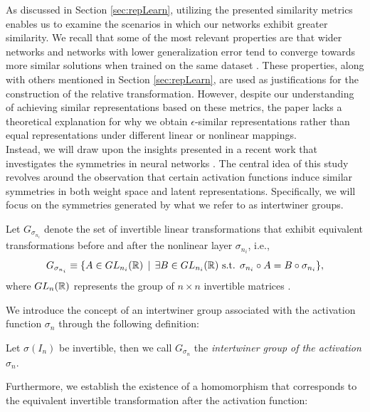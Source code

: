 \documentclass[../main.tex]{subfiles}
\begin{document}
As discussed in Section \ref{sec:repLearn}, utilizing the presented similarity metrics enables us to examine the scenarios in which our networks exhibit greater similarity. We recall that some of the most relevant properties are that wider networks and networks with lower generalization error tend to converge towards more similar solutions when trained on the same dataset \cite{morcos_insights_2018}. These properties, along with others mentioned in Section \ref{sec:repLearn}, are used as justifications for the construction of the relative transformation. However, despite our understanding of achieving similar representations based on these metrics, the paper lacks a theoretical explanation for why we obtain $\epsilon$-similar representations rather than equal representations under different linear or nonlinear mappings.\\

Instead, we will draw upon the insights presented in a recent work that investigates the symmetries in neural networks \cite{godfrey_symmetries_2023}. The central idea of this study revolves around the observation that certain activation functions induce similar symmetries in both weight space and latent representations. Specifically, we will focus on the symmetries generated by what we refer to as intertwiner groups.

Let $G_{\sigma_{n_i}}$ denote the set of invertible linear transformations that exhibit equivalent transformations before and after the nonlinear layer $\sigma_{n_i}$, i.e.,
\begin{equation*}
    G_{\sigma_{n_i}} \equiv \{A \in GL_{n_i}(\mathbb{R}) \, \mid \, \exists B\in
  GL_{n_i}(\mathbb{R})  \text{ s.t. } \sigma_{n_i} \circ A = B \circ \sigma_{n_i} \},
\end{equation*}
where $GL_{n}(\mathbb{R})$ represents the group of $n \times n$ invertible matrices \cite{godfrey_symmetries_2023}.

We introduce the concept of an intertwiner group associated with the activation function $\sigma_n$ through the following definition:

\begin{definition}
  \label{def:intertwiner}
  Let $\sigma(I_n)$ be invertible, then we call $G_{\sigma_n}$ the \emph{intertwiner group of the activation $\sigma_n$}. 
\end{definition}

Furthermore, we establish the existence of a homomorphism that corresponds to the equivalent invertible transformation after the activation function:
\end{document}
